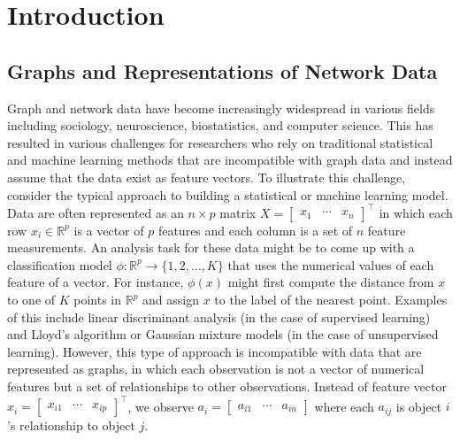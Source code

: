 \documentclass[
  11pt,
]{article}
\begin{document}
\hypertarget{introduction}{%
\section{Introduction}\label{introduction}}

\hypertarget{graphs-and-representations-of-network-data}{%
\subsection{Graphs and Representations of Network
Data}\label{graphs-and-representations-of-network-data}}

Graph and network data have become increasingly widespread in various
fields including sociology, neuroscience, biostatistics, and computer
science. This has resulted in various challenges for researchers who
rely on traditional statistical and machine learning methods that are
incompatible with graph data and instead assume that the data exist as
feature vectors. To illustrate this challenge, consider the typical
approach to building a statistical or machine learning model. Data are
often represented as an \(n \times p\) matrix
\(X = \begin{bmatrix} x_1 & \cdots & x_n \end{bmatrix}^\top\) in which
each row \(x_i \in \mathbb{R}^p\) is a vector of \(p\) features and each
column is a set of \(n\) feature measurements. An analysis task for
these data might be to come up with a classification model
\(\phi : \mathbb{R}^p \to \{1, 2, ..., K\}\) that uses the numerical
values of each feature of a vector. For instance, \(\phi(x)\) might
first compute the distance from \(x\) to one of \(K\) points in
\(\mathbb{R}^p\) and assign \(x\) to the label of the nearest point.
Examples of this include linear discriminant analysis (in the case of
supervised learning) and Lloyd's algorithm or Gaussian mixture models
(in the case of unsupervised learning). However, this type of approach
is incompatible with data that are represented as graphs, in which each
observation is not a vector of numerical features but a set of
relationships to other observations. Instead of feature vector
\(x_i = \begin{bmatrix} x_{i1} & \cdots & x_{ip} \end{bmatrix}^\top\),
we observe
\(a_i = \begin{bmatrix} a_{i1} & \cdots & a_{in} \end{bmatrix}\) where
each \(a_{ij}\) is object \(i\)'s relationship to object \(j\).
\end{document}
